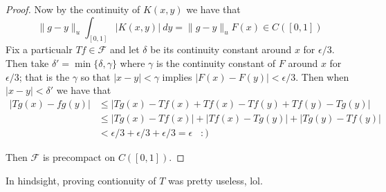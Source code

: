 \documentclass[11pt]{amsart}
\theoremstyle{definition}
\numberwithin{theorem}{section}
\numberwithin{definition}{section}
\numberwithin{equation}{section}
\def\scriptf{{\mathcal F}}
\begin{document}
\begin{proof}
	Now by the continuity of $K(x,y)$ we have that 
	\begin{equation*}
		\|g-y\|_u\int_{[0,1]} |K(x,y)|\ dy = \|g-y\|_u F(x) \in C([0,1])
	\end{equation*}
	Fix a particualr $Tf \in \scriptf$ and let $\delta$ be its continuity constant around $x$ for $\epsilon/3.$
	Then take $\delta' = \min\{\delta, \gamma\}$ where $\gamma$ is the continuity constant of $F$ around $x$ for $\epsilon/3$; that is the $\gamma$ so that $|x-y| < \gamma$ implies $|F(x) - F(y)| < \epsilon/3$. Then when $|x-y| < \delta'$ we have that
	\begin{equation*}
 	\begin{aligned}
 		|Tg(x) - fg(y)| &\leq |Tg(x) - Tf(x) + Tf(x) - Tf(y) + Tf(y) - Tg(y)| \\
 	&\leq |Tg(x) - Tf(x)| + |Tf(x) - Tg(y)| + |Tg(y) - Tf(y)|
 	\\
 	&< \epsilon/3 + \epsilon/3 + \epsilon/3 = \epsilon\;\;\; :)
 	\end{aligned}
 	\end{equation*}

 	Then $\scriptf$ is precompact on $C([0,1]).$
\end{proof}
In hindsight, proving contionuity of $T$ was pretty useless, lol.\\
\end{document}
